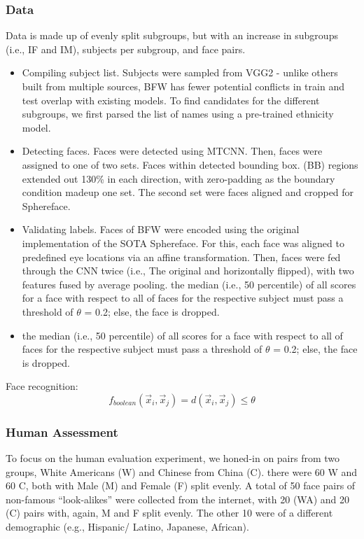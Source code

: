 \documentclass[12pt]{article}
\begin{document}
\subsubsection{Data}
Data is made up of evenly split subgroups, but with an increase in subgroups (i.e., IF and IM), subjects per subgroup, and face pairs.
\begin{itemize}
  \item Compiling subject list. Subjects were sampled
  from VGG2 - unlike others built from multiple sources, BFW has fewer potential conflicts in
  train and test overlap with existing models. To
  find candidates for the different subgroups, we first
  parsed the list of names using a pre-trained ethnicity model.
  \item Detecting faces. Faces were detected using
  MTCNN. Then, faces were assigned to one
  of two sets. Faces within detected bounding box. (BB) regions extended out 130\% in each direction,
  with zero-padding as the boundary condition madeup one set. The second set were faces aligned and
  cropped for Sphereface.
  \item Validating labels. Faces of BFW were encoded
  using the original implementation of the SOTA
  Sphereface. For this, each face was aligned to
  predefined eye locations via an affine transformation. Then, faces were fed through the CNN twice
  (i.e., The original and horizontally flipped), with
  two features fused by average pooling. the median (i.e., 50 percentile) of all scores for a face with respect to all of
  faces for the respective subject must pass a threshold of $\theta$ = 0.2; else, the face is dropped.
  \item the median (i.e., 50 percentile) of all scores for a face with respect to all of
faces for the respective subject must pass a threshold of $\theta$ = 0.2; else, the face is dropped.
\end{itemize}
Face recognition:
\[f_{boolean}(\vec{x}_i,\vec{x}_j) = d(\vec{x}_i,\vec{x}_j)\leq \theta\]
\subsubsection{Human Assessment}
To focus on the human evaluation experiment,
we honed-in on pairs from two groups, White
Americans (W) and Chinese from China (C). there were 60 W and 60 C,
both with Male (M) and Female (F) split evenly. A
total of 50 face pairs of non-famous “look-alikes”
were collected from the internet, with 20 (WA) and
20 (C) pairs with, again, M and F split evenly. The
other 10 were of a different demographic (e.g., Hispanic/ Latino, Japanese, African). 
\end{document}
